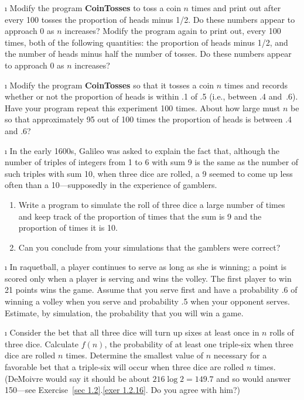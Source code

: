\exercises
\begin{LJSItem}

\i\label{exer 1.1.1} Modify the program {\bf CoinTosses} to toss a coin $n$
times and print out after every 100 tosses the proportion of heads minus 1/2.  Do 
these numbers appear to approach 0 as $n$ increases?  Modify the program again to print
out, every 100 times, both of the following quantities:  the proportion of heads 
minus 1/2,  and the number of heads minus half the number of tosses.  Do these numbers 
appear to approach 0 as $n$ increases?

\i\label{exer 1.1.2} Modify the program {\bf CoinTosses} so that it tosses a
coin $n$ times
and records whether or not the proportion of heads is within .1 of .5 (i.e.,
between .4 and~.6).  Have your program repeat this experiment 100 times. 
About
how large must $n$ be so that approximately 95 out of 100 times the
proportion
of heads is between .4 and .6?

\i\label{exer 1.1.3} In the early 1600s, Galileo was asked to explain the
fact that,
although the number of triples of integers from 1 to 6 with sum 9 is the same
as the
number of such triples with sum 10, when three dice are rolled, a 9 seemed to
come up less often than a 10---supposedly in the experience of gamblers.

\begin{enumerate}
\item Write a program to simulate the roll of three dice a large number of
times and keep track of the proportion of times that the sum is 9 and the
proportion of times it is 10.
\item Can you conclude from your simulations that the gamblers were correct?
\end{enumerate}

\i\label{exer 1.1.4} In raquetball, a player continues to serve as long as
she is winning; a
point is scored only when a player is serving and wins the volley.  The first
player to win 21 points wins the game.  Assume that you serve first and have
a
probability .6 of winning a volley when you serve and probability .5 when
your
opponent serves.  Estimate, by simulation, the probability that you will win
a
game.

\i\label{exer 1.1.5} Consider the bet that all three dice will turn up
sixes at least once in $n$ rolls of three dice.  Calculate $f(n)$, the probability 
of at least one triple-six when three dice are rolled $n$ times.  
Determine the smallest value of $n$ necessary for a favorable bet that a 
triple-six will occur when three dice are rolled $n$ times.  (DeMoivre would
say it
should be about $216\log 2 = 149.7$ and so would answer 150---see
Exercise~\ref{sec 1.2}.\ref{exer 1.2.16}.
Do you agree with him?)                           


\end{LJSItem}
